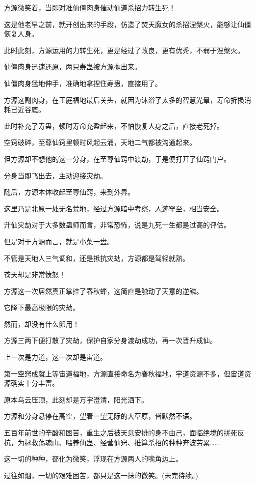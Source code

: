 \begin{this_body}
方源微笑着，当即对准仙僵肉身催动仙道杀招力转生死！

这是他老早之前，就开创出来的手段，仿造了焚天魔女的杀招涅槃火，能够让仙僵恢复人身。

此时此刻，方源运用的力转生死，更是经过了改良，更有优秀，不弱于涅槃火。

仙僵肉身迅速还原，两只寿蛊被方源抛出来。

仙僵肉身猛地伸手，准确地拿捏住寿蛊，直接用了。

方源这副肉身，在王庭福地最后关头，就因为沐浴了太多的智慧光晕，寿命折损消耗已近谷底。

此时补充了寿蛊，顿时寿命充盈起来，不怕恢复人身之后，直接老死掉。

空窍破碎，至尊仙窍里顿时风起云涌，天地二气都被沟通起来。

但方源却不想他的这一分身，在至尊仙窍中渡劫，于是便打开了仙窍门户。

分身当即飞出去，主动迎接灾劫。

随后，方源本体收起至尊仙窍，来到外界。

这里乃是北原一处无名荒地，经过方源暗中考察，人迹罕至，相当安全。

升仙灾劫对于大多数蛊师而言，非常恐怖，说是九死一生都是过高的评估。

但是对于方源而言，就是小菜一盘。

不管是天地人三气调和，还是抵抗灾劫，方源都是驾轻就熟。

苍天却是非常愤怒！

方源这一次居然真正掌控了春秋蝉，这简直是触动了天意的逆鳞。

它降下最高极限的灾劫。

然而，却没有什么卵用！

方源三两下便打散了灾劫，保护自家分身渡劫成功，再一次晋升成仙。

上一次是力道，这一次却是宙道。

第一空窍成就上等宙道福地，方源直接命名为春秋福地，宇道资源不多，但宙道资源确实十分丰富。

原本乌云压顶，此刻却是万宇澄清，阳光洒下。

方源和分身悬停在高空，望着一望无际的大草原，皆默然不语。

五百年前世的辛酸和困苦，重生之后被天意安排的身不由己，面临绝境的拼死反抗，为拯救荡魂山、喂养仙蛊、经营仙窍、推算杀招的种种奔波劳累……

这一切的种种，都化为微笑，浮现在方源两人的嘴角边上。

过往如烟，一切的艰难困苦，都只是这一抹的微笑。(未完待续。)

\end{this_body}

